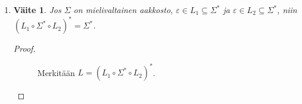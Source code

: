 \documentclass[a4paper,11pt,draft]{article}
\newtheorem*{claim}{Väite}
\begin{document}
\begin{enumerate}
\begin{enumerate}
\begin{proof}
\begin{description}
\begin{itemize}
\begin{itemize}
          \item
            Jos $u_i = b$ jollain $i \in \{1, \ldots, n\}$, jaetaan
%
            \begin{equation*}
              u = u_1 \ldots u_ju_{j+1} \ldots u_n
            \end{equation*}
%
            missä $u_{j+1}$ on ensimmäinen $b$ merkkijonossa $u$. Nyt
%
            \begin{equation*}
              bu_1 \ldots u_j = ba^j \in (\{b\} \circ \{a\}^*)^*
            \end{equation*}
%
            ja induktio-oletuksen nojalla $u_{j+1} \ldots u_n \in A$. Nyt
            $u_{j+1} \ldots u_n = v_1v_2$ missä
%
            \begin{equation*}
              v_1 \in \{a\}^* \text{ ja }
              v_2 \in \{ \{b\} \circ \{a\}^* \}^* \text{.}
            \end{equation*}
%
            Tällöin $v_1 = a^k$ jollain $k \ge 1$. Kuitenkin $u_{j+1} =
            b$, joten $v_1 = \varepsilon$ ja $u_{j+1} \ldots u_n = v_2 \in
            \{\{b\} \circ \{a\}^*\}^*$. Nyt
%
            \begin{align*}
                          & bu_1 \ldots u_j \in \{b\} \circ \{a\}^* &  \\
              \text{ ja } & u_{j+1} \ldots u_n \in \{\{b\} \circ \{a\}^*\}^*
            \end{align*}
%
            joten $w = \varepsilon (bu) \in A$.

          \end{itemize}
        \end{itemize}
      \end{description}

      Olkoon sitten $w \in A$. Nyt $w = u_1 \ldots u_n$ missä $u_i \in
      \{a, b\}$ kaikilla $i$. Siten $w \in \{a,b\}^*$.

      On siis osoitettu, että $\{a,b\}^* \subseteq A$ ja $A \subseteq
      \{a,b\}^*$ joten joukot ovat samat.
    \end{proof}

  \item
    \begin{claim}
      Jos $\Sigma$ on mielivaltainen aakkosto, $\varepsilon \in L_1 \subseteq
      \Sigma^*$ ja $\varepsilon \in L_2 \subseteq \Sigma^*$, niin $(L_1 \circ
      \Sigma^* \circ L_2)^* = \Sigma^*$.
    \end{claim}

    \begin{proof}
      \begin{description}
      \item[]Merkitään $L = (L_1 \circ \Sigma^* \circ L_2)^*$.


\end{description}
\end{proof}
\end{enumerate}
\end{enumerate}
\end{document}
